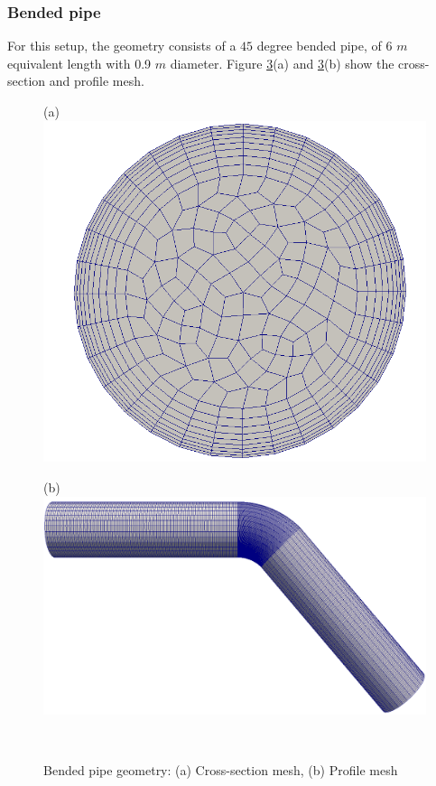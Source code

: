 \documentclass[review,3p,times,12pt]{elsarticle}
\begin{document}
\subsubsection{Bended pipe}\label{bended}
For this setup, the geometry consists of a $45$ degree bended pipe, of 6 $m$ equivalent length with 0.9 $m$ diameter. Figure \ref{bend}(a) and \ref{bend}(b) show the cross-section and profile mesh.\\
\begin{minipage}[t]{0.35\textwidth}
\begin{figure}[H]
\begin{center}
(a)\includegraphics[scale =0.09]{section.png}
    \label{fig:gauss}
    \end{center}
\end{figure}
\end{minipage}\hfill
 \begin{minipage}[t]{0.4\textwidth}
\begin{figure}[H]
(b)\includegraphics[scale = 0.17]{bend.png}
    \label{fig:gauss}
\end{figure}
\end{minipage}\\
\begin{figure}[H]
    \centering
    \caption{Bended pipe geometry: (a) Cross-section mesh, (b) Profile mesh }
    \label{bend}
\end{figure}
\end{document}
